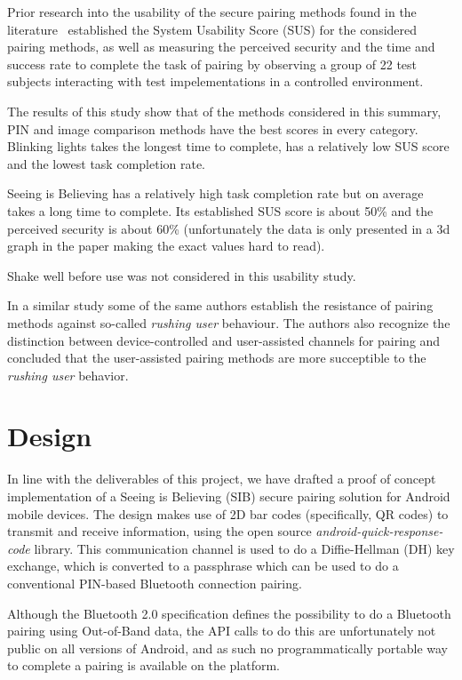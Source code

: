 \documentclass[conference, 11pt]{sty/IEEEtran}
\begin{document}

Prior research into the usability of the secure pairing methods found in the literature~\cite{kumar2009comparative} established the System Usability Score (SUS) for the considered pairing methods, as well as measuring the perceived security and the time and success rate to complete the task of pairing by observing a group of 22 test subjects interacting with test impelementations in a controlled environment.

The results of this study show that of the methods considered in this summary, PIN and image comparison methods have the best scores in every category.
Blinking lights takes the longest time to complete, has a relatively low SUS score and the lowest task completion rate.

Seeing is Believing has a relatively high task completion rate but on average takes a long time to complete.
Its established SUS score is about 50\% and the perceived security is about 60\% (unfortunately the data is only presented in a 3d graph in the paper making the exact values hard to read).

Shake well before use was not considered in this usability study.

In a similar study \cite{kobsa2009serial} some of the same authors establish the resistance of pairing methods against so-called \textit{rushing user} behaviour.
The authors also recognize the distinction between device-controlled and user-assisted channels for pairing and concluded that the user-assisted pairing methods are more succeptible to the \textit{rushing user} behavior.

\section{Design}
\label{sec:design}
In line with the deliverables of this project, we have drafted a proof of concept implementation of a Seeing is Believing (SIB) secure pairing solution for Android mobile devices.
The design makes use of 2D bar codes (specifically, QR codes) to transmit and receive information, using the open source \textit{android-quick-response-code}\cite{aqrc} library.
This communication channel is used to do a Diffie-Hellman (DH) key exchange, which is converted to a passphrase which can be used to do a conventional PIN-based Bluetooth connection pairing.

Although the Bluetooth 2.0 specification defines the possibility to do a Bluetooth pairing using Out-of-Band data, the API calls to do this are unfortunately not public on all versions of Android, and as such no programmatically portable way to complete a pairing is available on the platform.
\end{document}
